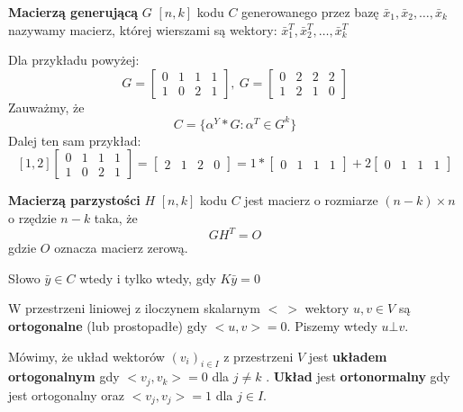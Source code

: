 \begin{definition}\textbf{Macierzą generującą} $G$ $[n,k]$ kodu $C$ generowanego przez bazę $\bar{x}_1,\bar{x}_2,\dots ,\bar{x}_k$ nazywamy macierz, której wierszami są wektory: $\bar{x}_1^T,\bar{x}_2^T,\dots ,\bar{x}_k^T$

Dla przykładu powyżej:
$$G=\begin{bmatrix}
0&1&1&1\\
1&0&2&1
\end{bmatrix},\ G=\begin{bmatrix}
0&2&2&2\\
1&2&1&0
\end{bmatrix}$$
Zauważmy, że $$C=\{\alpha ^Y*G:\alpha ^T\in G^k\}$$
Dalej ten sam przykład:
$$[ 1, 2 ] \begin{bmatrix}
0&1&1&1\\
1&0&2&1
\end{bmatrix}=\begin{bmatrix}
2&1&2&0
\end{bmatrix}=1*\begin{bmatrix}
0&1&1&1
\end{bmatrix}+2\begin{bmatrix}
0&1&1&1
\end{bmatrix}$$
\end{definition}



\begin{definition}
\textbf{Macierzą parzystości} $H$ $[n,k]$ kodu $C$ jest macierz o rozmiarze $(n-k)\times n$ o rzędzie $n-k$ taka, że $$GH^T=O$$ gdzie $O$ oznacza macierz zerową. 
\end{definition}
\begin{fact*}
Słowo $\bar{y}\in C$ wtedy i tylko wtedy, gdy $K\bar{y}=0$
\end{fact*}

\begin{definition}[Ortogonalność]
W przestrzeni liniowej z iloczynem skalarnym $<\ >$ wektory $u,v\in V$ są \textbf{ortogonalne} (lub prostopadłe) gdy $<u,v>=0$. Piszemy wtedy $u\bot v$.
\end{definition}

\begin{definition}
Mówimy, że układ wektorów $(v_i)_{i\in I}$ z przestrzeni $V$ jest \textbf{układem ortogonalnym} gdy $<v_j, v_k> = 0$ dla $j\neq k$ . \textbf{Układ} jest \textbf{ortonormalny} gdy jest ortogonalny oraz $<v_j
, v_j> = 1$ dla $j\in I$.
\end{definition}

